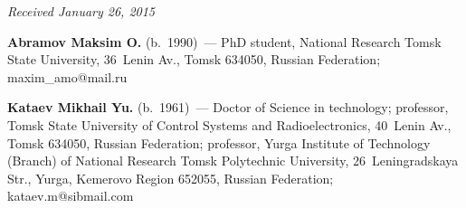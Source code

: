 \vspace*{-3pt}

\hfill{\small\textit{Received January 26, 2015}}

\Contr

\noindent
\textbf{Abramov Maksim O.} (b.\ 1990)~---
PhD student, National Research Tomsk State University,
 36~Lenin Av., Tomsk 634050, Russian Federation;  maxim\_amo@mail.ru

\vspace*{3pt}

\noindent
\textbf{Kataev Mikhail Yu.} (b.\ 1961)~---
Doctor of Science in technology;
professor,  Tomsk State University of Control Systems and Radioelectronics, 
40~Lenin Av., Tomsk 634050, Russian Federation; professor, Yurga Institute of 
Technology (Branch) of National Research Tomsk Polytechnic University, 
26~Leningradskaya Str., Yurga, Kemerovo Region 652055, Russian Federation;
kataev.m@sibmail.com


\label{end\stat}


\renewcommand{\bibname}{\protect\rm Литература}